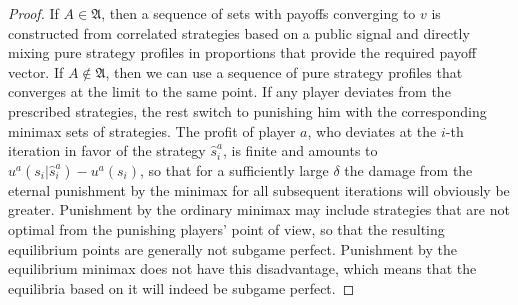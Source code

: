 \begin{proof}
	If $A \in \mathfrak{A}$, then a sequence of sets with payoffs converging to $v$ is constructed from correlated strategies based on a public signal and directly mixing pure strategy profiles in proportions that provide the required payoff vector. If $A \notin \mathfrak{A}$, then we can use a sequence of pure strategy profiles that converges at the limit to the same point. If any player deviates from the prescribed strategies, the rest switch to punishing him with the corresponding minimax sets of strategies. The profit of player $a$, who deviates at the $i$-th iteration in favor of the strategy $\hat{s}^a_i$, is finite and amounts to $u^a(s_i | \hat{s}^a_i) - u^a( s_i)$, so that for a sufficiently large $\delta$ the damage from the eternal punishment by the minimax for all subsequent iterations will obviously be greater. Punishment by the ordinary minimax may include strategies that are not optimal from the punishing players' point of view, so that the resulting equilibrium points are generally not subgame perfect. Punishment by the equilibrium minimax does not have this disadvantage, which means that the equilibria based on it will indeed be subgame perfect. %
\end{proof}

